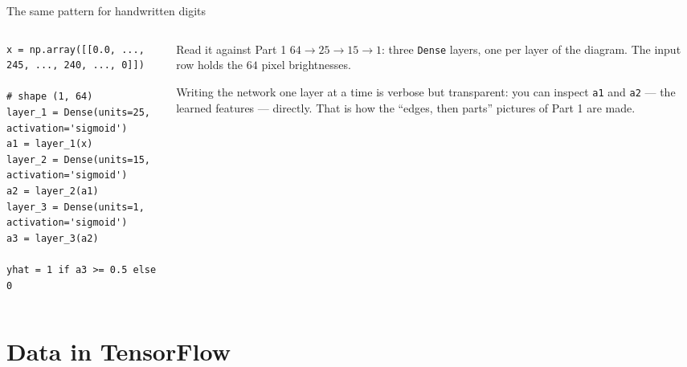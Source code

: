 \documentclass[aspectratio=169,10pt]{beamer}
\begin{document}
\begin{frame}[fragile]{The same pattern for handwritten digits}
  \begin{columns}[T,onlytextwidth]
    \begin{column}{0.5\textwidth}
\begin{lstlisting}
x = np.array([[0.0, ..., 245, ..., 240, ..., 0]])
                                  # shape (1, 64)
layer_1 = Dense(units=25, activation='sigmoid')
a1 = layer_1(x)
layer_2 = Dense(units=15, activation='sigmoid')
a2 = layer_2(a1)
layer_3 = Dense(units=1, activation='sigmoid')
a3 = layer_3(a2)

yhat = 1 if a3 >= 0.5 else 0
\end{lstlisting}
    \end{column}
    \begin{column}{0.46\textwidth}
      \footnotesize
      \begin{block}{Read it against Part 1}
        $64\to25\to15\to1$: three \texttt{Dense} layers, one per layer of the diagram. The
        input row holds the $64$ pixel brightnesses.
      \end{block}
      \begin{keyidea}
        Writing the network one layer at a time is verbose but transparent: you can inspect
        \texttt{a1} and \texttt{a2} --- the learned features --- directly. That is how the
        ``edges, then parts'' pictures of Part 1 are made.
      \end{keyidea}
    \end{column}
  \end{columns}
\end{frame}

\section{Data in TensorFlow}
\end{document}
